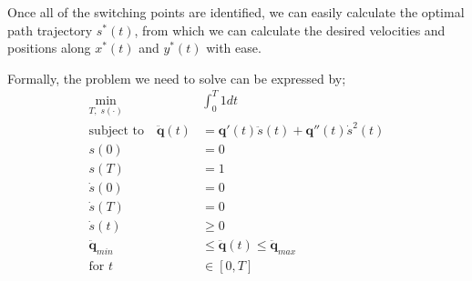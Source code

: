 Once all of the switching points are identified, we can easily calculate the optimal path trajectory $s^*(t)$, from which we can calculate the desired velocities and positions along $x^*(t)$ and $y^	*(t)$ with ease.

Formally, the problem we need to solve can be expressed by;
\begin{align*}
\min_{T, \; s(\cdot)} \;& \int_0^T1dt\\
\text{subject to} \quad \ddot{\textbf{q}}(t) &= \textbf{q}'(t)\ddot{s}(t) + \textbf{q}''(t)\dot{s}^2(t)\\
s(0) &= 0\\
s(T) &= 1\\
\dot{s}(0) &= 0\\
\dot{s}(T) &= 0\\
\dot{s}(t) &\geq 0\\
\ddot{\textbf{q}}_{min} &\leq \ddot{\textbf{q}}(t) \leq \ddot{\textbf{q}}_{max}\\
\text{for } t &\in [0,T]\\
\end{align*}